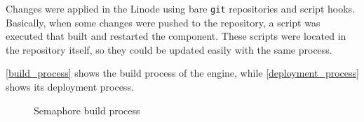 \documentclass[a4paper,11pt,titlepage,abstract,numbers=noenddot,automark,mnsy,intlimits,rgb,dvipsnames]{report}
\begin{document}
Changes were applied in the Linode using bare \texttt{git} repositories and script hooks. Basically,
when some changes were pushed to the repository, a script was executed that built and restarted the component.
These scripts were located in the repository itself, so they could be updated easily with the same process.

\autoref{build_process} shows the build process of the engine, while \autoref{deployment_process} shows
its deployment process.
\begin{figure}[H]
\begin{center}
\noindent{}
\end{center}
\caption{Semaphore build process}
\label{build_process}
\end{figure}
\end{document}
